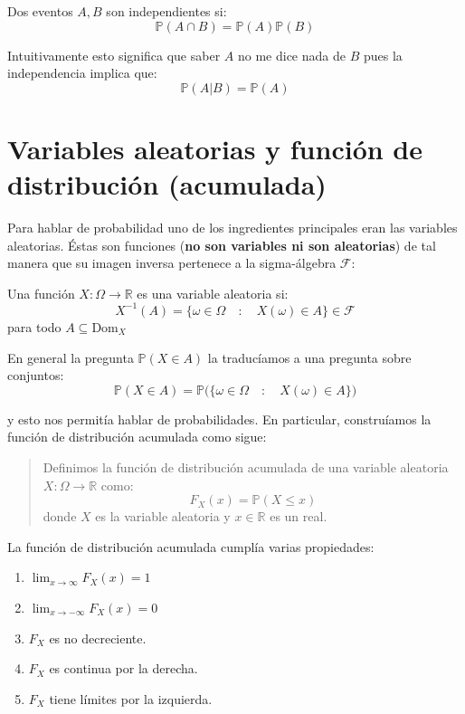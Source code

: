 \documentclass[
]{book}
\providecommand{\tightlist}{%
  \setlength{\itemsep}{0pt}\setlength{\parskip}{0pt}}
\begin{document}
Dos eventos \(A,B\) son independientes si:
\[
\mathbb{P}(A \cap B) = \mathbb{P}(A) \mathbb{P}(B)
\]

Intuitivamente esto significa que saber \(A\) no me dice nada de \(B\) pues la independencia implica que:
\[
\mathbb{P}(A | B) = \mathbb{P}(A)
\]

\hypertarget{variables-aleatorias-y-funciuxf3n-de-distribuciuxf3n-acumulada}{%
\section{Variables aleatorias y función de distribución (acumulada)}\label{variables-aleatorias-y-funciuxf3n-de-distribuciuxf3n-acumulada}}

Para hablar de probabilidad uno de los ingredientes principales eran las variables aleatorias. Éstas son funciones (\textbf{no son variables ni son aleatorias}) de tal manera que su imagen inversa pertenece a la sigma-álgebra \(\mathcal{F}\):

Una función \(X: \Omega \to \mathbb{R}\) es una variable aleatoria si:
\[
X^{-1}(A) = \{ \omega \in \Omega \quad : \quad X(\omega) \in A \} \in \mathcal{F}
\]
para todo \(A\subseteq\textrm{Dom}_X\)

En general la pregunta \(\mathbb{P}(X \in A)\) la traducíamos a una pregunta sobre conjuntos:
\[
\mathbb{P}(X \in A) = \mathbb{P}\Big( \{ \omega \in \Omega \quad : \quad X(\omega) \in A \} \Big)
\]

y esto nos permitía hablar de probabilidades. En particular, construíamos la función de distribución acumulada como sigue:

\begin{quote}
Definimos la función de distribución acumulada de una variable aleatoria \(X: \Omega \to \mathbb{R}\) como:
\[
F_X(x) = \mathbb{P}(X \leq x)
\]
donde \(X\) es la variable aleatoria y \(x\in\mathbb{R}\) es un real.
\end{quote}

La función de distribución acumulada cumplía varias propiedades:

\begin{enumerate}
\def\labelenumi{\arabic{enumi}.}
\tightlist
\item
  \(\lim_{x \to \infty} F_X(x) = 1\)
\item
  \(\lim_{x \to -\infty} F_X(x) = 0\)
\item
  \(F_X\) es no decreciente.
\item
  \(F_X\) es continua por la derecha.
\item
  \(F_X\) tiene límites por la izquierda.
\end{enumerate}
\end{document}
